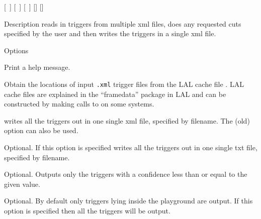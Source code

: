 \begin{entry}
 \newline \hspace*{0.5in}
[~] \newline \hspace*{0.5in}
[~] \newline \hspace*{0.5in}
[~] \newline \hspace*{0.5in}
[] \newline \hspace*{0.5in}
[]

\item[Description] 
 reads in triggers from multiple xml files, does any
requested cuts specified by the user and then writes the triggers in a
single xml file.  

\item[Options]\leavevmode
\begin{entry}
\item[\option{--help}] Print a help message.

\item[\option{--input} \parm{cache file}]
Obtain the locations of input \texttt{.xml} trigger files from the LAL
cache file .  LAL cache files are explained in the
``framedata'' package in LAL and can be constructed by making calls to
 on some systems.  


\item[\option{--output} \parm{filename}]
 writes all the triggers out in one single xml file,
specified by filename.  The (old) option  can also be
used.

\item[\option{--outtxt} \parm{filename}]
Optional.  If this option is specified  writes all the 
triggers out in one single txt file, specified by filename. 

\item[\option{--max-confidence} \parm{maximum conf}]
Optional. Outputs only the triggers with a confidence less than or equal to
the given value.

\item[\option{--noplayground}]
Optional. By default only triggers lying inside the playground are output.
If this option is specified then all the triggers will be output. 


\end{entry}
\end{entry}
